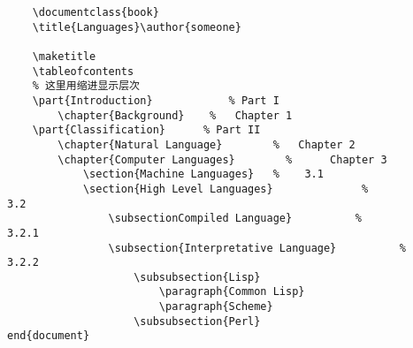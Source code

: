 \begin{lstlisting}
    \documentclass{book}
    \title{Languages}\author{someone}
    
    \maketitle
    \tableofcontents
    % 这里用缩进显示层次
    \part{Introduction}            % Part I
        \chapter{Background}    %   Chapter 1
    \part{Classification}      % Part II
        \chapter{Natural Language}        %   Chapter 2
        \chapter{Computer Languages}        %      Chapter 3
            \section{Machine Languages}   %    3.1
            \section{High Level Languages}              %             3.2
                \subsectionCompiled Language}          %           3.2.1
                \subsection{Interpretative Language}          %             3.2.2
                    \subsubsection{Lisp}
                        \paragraph{Common Lisp}
                        \paragraph{Scheme}
                    \subsubsection{Perl}
end{document}
\end{lstlisting}

